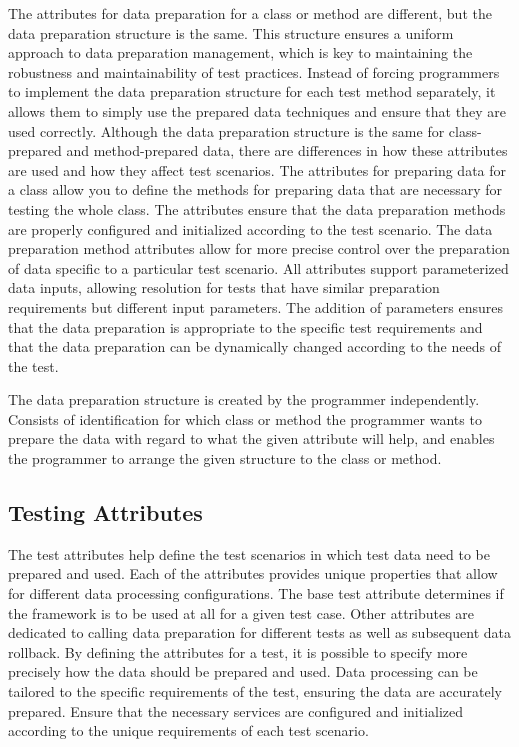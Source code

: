 The attributes for data preparation for a class or method are different, but the data preparation structure is the same. This structure ensures a uniform approach to data preparation management, which is key to maintaining the robustness and maintainability of test practices. Instead of forcing programmers to implement the data preparation structure for each test method separately, it allows them to simply use the prepared data techniques and ensure that they are used correctly.
Although the data preparation structure is the same for class-prepared and method-prepared data, there are differences in how these attributes are used and how they affect test scenarios. The attributes for preparing data for a class allow you to define the methods for preparing data that are necessary for testing the whole class. The attributes ensure that the data preparation methods are properly configured and initialized according to the test scenario. The data preparation method attributes allow for more precise control over the preparation of data specific to a particular test scenario. 
All attributes support parameterized data inputs, allowing resolution for tests that have similar preparation requirements but different input parameters. The addition of parameters ensures that the data preparation is appropriate to the specific test requirements and that the data preparation can be dynamically changed according to the needs of the test.

The data preparation structure is created by the programmer independently. Consists of identification for which class or method the programmer wants to prepare the data with regard to what the given attribute will help, and enables the programmer to arrange the given structure to the class or method.

\subsection*{Testing Attributes}\label{subs:test_attrib}

The test attributes help define the test scenarios in which test data need to be prepared and used. Each of the attributes provides unique properties that allow for different data processing configurations. The base test attribute determines if the framework is to be used at all for a given test case. Other attributes are dedicated to calling data preparation for different tests as well as subsequent data rollback. By defining the attributes for a test, it is possible to specify more precisely how the data should be prepared and used. Data processing can be tailored to the specific requirements of the test, ensuring the data are accurately prepared.
Ensure that the necessary services are configured and initialized according to the unique requirements of each test scenario.


